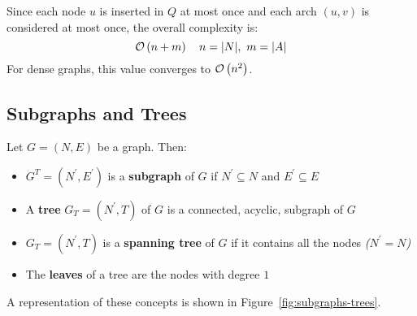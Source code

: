 \documentclass[english]{article}
\begin{document}
Since each node \(u\) is inserted in \(Q\) at most once and each arch \((u,v)\) is considered at most once, the overall complexity is:
\[ \mathcal{O}\left(n+m\right) \quad n = |N|, \ m =|A|\]
For dense graphs, this value converges to \(\mathcal{O}\left(n^2\right)\).

\subsection{Subgraphs and Trees}

Let \(G = (N, E)\) be a graph.
Then:

\begin{itemize}
  \item \(G^T = (N^\prime, E^\prime)\) is a \textbf{subgraph} of \(G\) if \(N^\prime \subseteq N\) and \(E^\prime \subseteq E\)
  \item A \textbf{tree} \(G_T = (N^\prime, T)\) of \(G\) is a connected, acyclic, subgraph of \(G\)
  \item \(G_T = (N^\prime, T)\) is a \textbf{spanning tree} of \(G\) if it contains all the nodes \textit{(\(N^\prime = N\))}
  \item The \textbf{leaves} of a tree are the nodes with degree \(1\)
\end{itemize}

\bigskip
A representation of these concepts is shown in Figure~\ref{fig:subgraphs-trees}.
\end{document}
